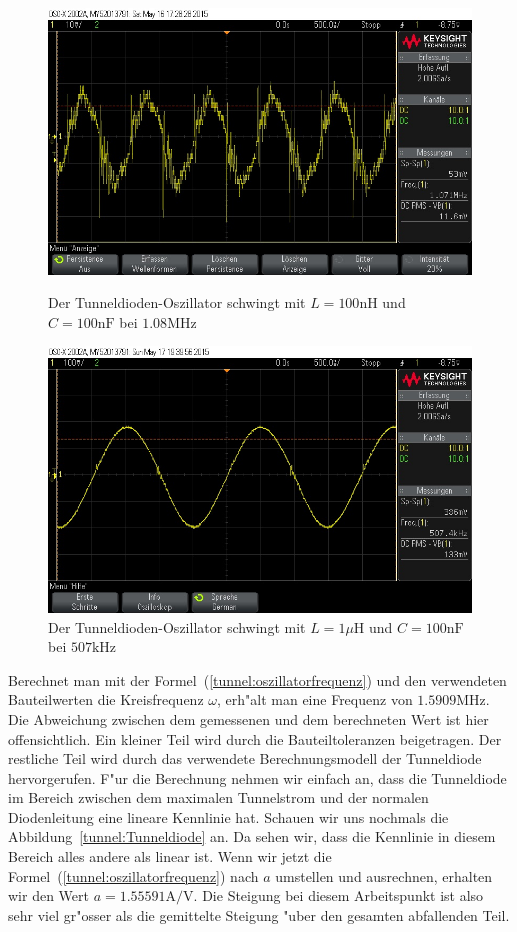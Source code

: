\begin{refsection}
\begin{figure}	%
\centering
\includegraphics[width=\hsize]{tunneldiode/images/Oszi_1.jpg}
\caption{Der Tunneldioden-Oszillator schwingt mit $L = 100\text{nH}$ und $C=100\text{nF}$ bei $1.08\text{MHz}$
\label{tunnel:oszi1}}
\includegraphics[width=\hsize]{tunneldiode/images/Oszi_2.jpg}
\caption{Der Tunneldioden-Oszillator schwingt mit $L = 1\mu\text{H}$ und $C=100\text{nF}$ bei $507\text{kHz}$
\label{tunnel:oszi2}}
\end{figure}

Berechnet man mit der Formel~(\ref{tunnel:oszillatorfrequenz}) und den verwendeten Bauteilwerten die Kreisfrequenz $\omega$, erh"alt man eine Frequenz von $1.5909\text{MHz}$.
Die Abweichung zwischen dem gemessenen und dem berechneten Wert ist hier offensichtlich.
Ein kleiner Teil wird durch die Bauteiltoleranzen beigetragen.
Der restliche Teil wird durch das verwendete Berechnungsmodell der Tunneldiode hervorgerufen.
F"ur die Berechnung nehmen wir einfach an, dass die Tunneldiode im Bereich zwischen dem maximalen Tunnelstrom und der normalen Diodenleitung eine lineare Kennlinie hat.
Schauen wir uns nochmals die Abbildung~\ref{tunnel:Tunneldiode} an.
Da sehen wir, dass die Kennlinie in diesem Bereich alles andere als linear ist.
Wenn wir jetzt die Formel~(\ref{tunnel:oszillatorfrequenz}) nach $a$ umstellen und ausrechnen, erhalten wir den Wert $a = 1.55591\text{A/V}$.
Die Steigung bei diesem Arbeitspunkt ist also sehr viel gr"osser als die gemittelte Steigung "uber den gesamten abfallenden Teil.


\end{refsection}
